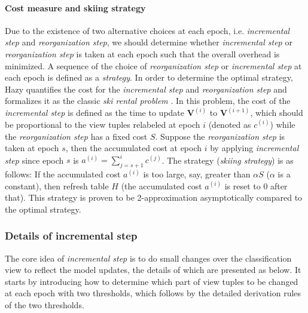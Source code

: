 \paragraph{Cost measure and skiing strategy} Due to the existence of two alternative choices at each epoch, i.e. {\em incremental step} and {\em reorganization step}, we should determine whether {\em incremental step} or {\em reorganization step} is taken at each epoch such that the overall overhead is minimized. A sequence of the choice of {\em reorganization step} or {\em incremental step} at each epoch is defined as a {\em strategy}. In order to determine the optimal strategy, Hazy quantifies the cost for the {\em incremental step} and {\em reorganization step} and formalizes it as the classic {\em ski rental problem} \cite{karlin1994competitive}. In this problem, the cost of the {\em incremental step} is defined as the time to update $\textbf{V}^{(i)}$ to $\textbf{V}^{(i+1)}$, which should be proportional to the view tuples relabeled at epoch $i$ (denoted as $c^{(i)}$) while the {\em reorganization step} has a fixed cost $S$. Suppose the {\em reorganization step} is taken at epoch $s$, then the accumulated cost at epoch $i$ by applying {\em incremental step} since epoch $s$ is $a^{(i)} = \sum_{j=s+1}^ic^{(j)}$. The strategy ({\em skiing strategy}) is as follows: If the accumulated cost $a^{(i)}$ is too large, say, greater than $\alpha S$ ($\alpha$ is a constant), then refresh table $H$ (the accumulated cost $a^{(i)}$ is reset to 0 after that). This strategy is proven to be 2-approximation asymptotically compared to the optimal strategy.


\subsubsection{Details of incremental step}\label{Sec: incremental step}
The core idea of {\em incremental step} is to do small changes over the classification view to reflect the model updates, the details of which are presented as below. It starts by introducing how to determine which part of view tuples to be changed at each epoch with two thresholds, which follows by the detailed derivation rules of the two thresholds.

